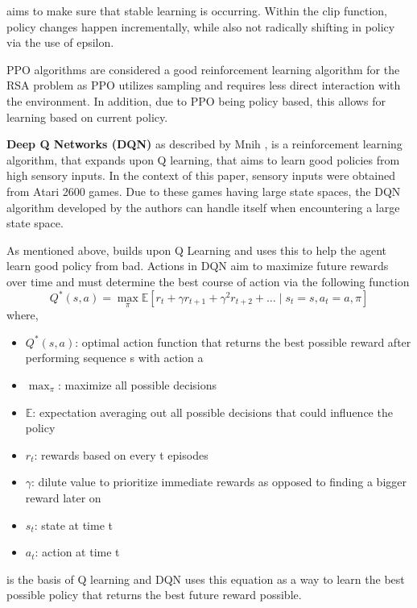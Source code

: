 \documentclass[conference]{IEEEtran}
\begin{document}
aims to make sure that stable learning is occurring. Within the clip function, policy changes happen incrementally, while also not radically shifting in policy via the use of epsilon. 

PPO algorithms are considered a good reinforcement learning algorithm for the RSA problem as PPO utilizes sampling and requires less direct interaction with the environment. In addition, due to PPO being policy based, this allows for learning based on current policy. 

\textbf{Deep Q Networks (DQN)} as described by Mnih \cite{14236}, is a reinforcement learning algorithm, that expands upon Q learning, that aims to learn good policies from high sensory inputs. In the context of this paper, sensory inputs were obtained from Atari 2600 games. Due to these games having large state spaces, the DQN algorithm developed by the authors can handle itself when encountering a large state space. 

As mentioned above, \cite{14236} builds upon Q Learning and uses this to help the agent learn good policy from bad. Actions in DQN aim to maximize future rewards over time and must determine the best course of action via the following function
\begin{equation}
    Q^*(s, a) = \max_\pi \mathbb{E} \left[r_t + \gamma r_{t+1} + \gamma^2 r_{t+2} + \ldots \mid s_t = s, a_t = a, \pi \right]
    \label{eq:dqn_clip}
\end{equation}
where,
\begin{itemize}
    \item $Q^*(s, a)$: optimal action function that returns the best possible reward after performing sequence s with action a
    \item $\max_\pi$: maximize all possible decisions
    \item $\mathbb{E}$: expectation averaging out all possible decisions that could influence the policy
    \item $r_t$: rewards based on every t episodes
    \item $\gamma$: dilute value to prioritize immediate rewards as opposed to finding a bigger reward later on
    \item $s_t$: state at time t
    \item $a_t$: action at time t
    
\end{itemize}

is the basis of Q learning and DQN uses this equation as a way to learn the best possible policy that returns the best future reward possible. 
\end{document}
